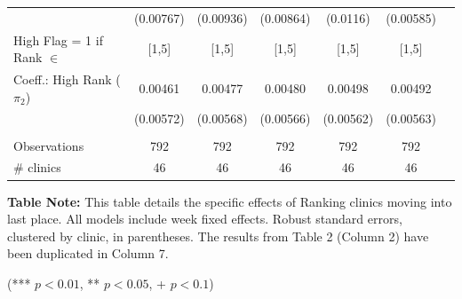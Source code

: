 \begin{table}
{\begin{threeparttable}[t]
\begin{tabular}{lcccccr}
          & (0.00767) & (0.00936) & (0.00864) & (0.0116) & (0.00585) &  \\
    High Flag = 1 if Rank $\in$ & [1,5] & [1,5] & [1,5] & [1,5] & [1,5] &  \\
    Coeff.: High Rank ($\pi_2$) & 0.00461 & 0.00477 & 0.00480 & 0.00498 & 0.00492 &  \\
          & (0.00572) & (0.00568) & (0.00566) & (0.00562) & (0.00563) &  \\
          &       &       &       &       &       &  \\
    Observations & 792   & 792   & 792   & 792   & 792   &  \\
    \# clinics & 46    & 46    & 46    & 46    & 46    &  \\
    \end{tabular}%
    \medskip
    \begin{tablenotes}
      \footnotesize
      \item \textbf{Table Note:} This table details the specific effects of Ranking clinics moving into last place. All models include week fixed effects. Robust standard errors, clustered by clinic, in parentheses. The results from Table 2 (Column 2) have been duplicated in Column 7.
      \item (*** $p < 0.01$, ** $p < 0.05$, + $p < 0.1$)
    \end{tablenotes}
  \label{tab:sensitivity_def_last}
  \end{threeparttable} }
 \end{table}
 
